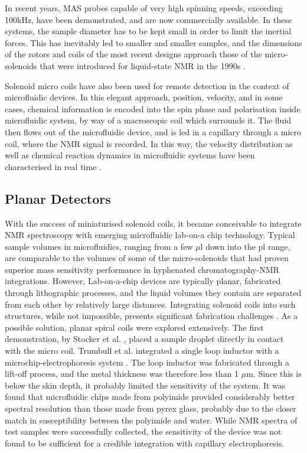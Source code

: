 In recent years, MAS probes
capable of very high spinning speeds, exceeding 100kHz, have been
demonstrated, and are now commercially available. In these systems, the
sample diameter has to be kept small in order to limit the inertial
forces. This has inevitably led to smaller and smaller samples, and the
dimensions of the rotors and coils of the most recent designs approach
those of the micro-solenoids that were introduced for liquid-state NMR
in the 1990s \cite{Samoson:2010et}. 

Solenoid micro coils have also been
used for remote detection in the context of microfluidic devices. In
this elegant approach, position, velocity, and in some cases, chemical
information is encoded into the spin phase and polarisation inside
microfluidic system, by way of a macroscopic coil which surrounds it.
The fluid then flows out of the microfluidic device, and is led in a
capillary through a micro coil, where the NMR signal is recorded. In
this way, the velocity distribution as well as chemical reaction
dynamics in microfluidic systems have been characterised in real time
\cite{Hilty:2005eq, McDonnell:2005dn,Harel:2007bs, Bouchard:2008hv,
Ledbetter:2008kp,Harel:2009eg,Bajaj:2010cy,Telkki:2011wi,Telkki:2014jf}.

\subsection{Planar Detectors}\label{nmr-and-microfluidics-planar-detectors}
With the success of miniaturised solenoid coils, it became conceivable
to integrate NMR spectroscopy with emerging microfluidic lab-on-a chip
technology. Typical sample volumes in microfluidics, ranging from a few
$\mu$l down into the pl range, are comparable to the volumes of some of
the micro-solenoids that had proven superior mass sensitivity
performance in hyphenated chromatography-NMR integrations. However,
Lab-on-a-chip devices are typically planar, fabricated through
lithographic processes, and the liquid volumes they contain are
separated from each other by relatively large distances. Integrating
solenoid coils into such structures, while not impossible, presents
significant fabrication challenges \cite{Badilita:2010hb}. As a possible
solution, planar spiral coils were explored extensively. The first
demonstration, by Stocker et al. \cite{Stocker:1997by}, placed a sample
droplet directly in contact with the micro coil. Trumbull et al.
integrated a single loop inductor with a microchip-electrophoresis
system \cite{Trumbull:2000vb}. The loop inductor
was fabricated through a lift-off process, and the metal thickness 
was therefore less than 1 $\mu$m. Since this is below the skin depth, it
probably limited the sensitivity of the system. It was found that
microfluidic chips made from polyimide provided
considerably better spectral resolution than those made from pyrex glass,
 probably due to the closer
 match in susceptibility between the polyimide and water. While NMR
spectra of test samples were successfully collected, the sensitivity of
the device was not found to be sufficient for a credible integration
with capillary electrophoresis. 

